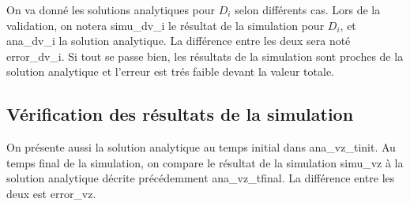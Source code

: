 On va donn\'e les solutions analytiques pour $D_i$ selon diff\'erents cas.
Lors de la validation, on notera {\textsf simu\_dv\_i} le r\'esultat de la
simulation pour $D_i$, et {\textsf ana\_dv\_i} la solution analytique.
La diff\'erence entre les deux sera not\'e \textsf{error\_dv\_i}. Si tout se passe bien, les r\'esultats de la simulation sont proches de la solution analytique et l'erreur est tr\'es faible devant la valeur totale.

\subsection{V\'erification des r\'esultats de la simulation}

On pr\'esente aussi la solution analytique au temps initial dans {\textsf ana\_vz\_tinit}. Au temps final de la simulation, on compare le r\'esultat de la simulation {\textsf simu\_vz} \`a la solution analytique d\'ecrite pr\'ec\'edemment {\textsf ana\_vz\_tfinal}. La diff\'erence entre les deux est \textsf{error\_vz}.

